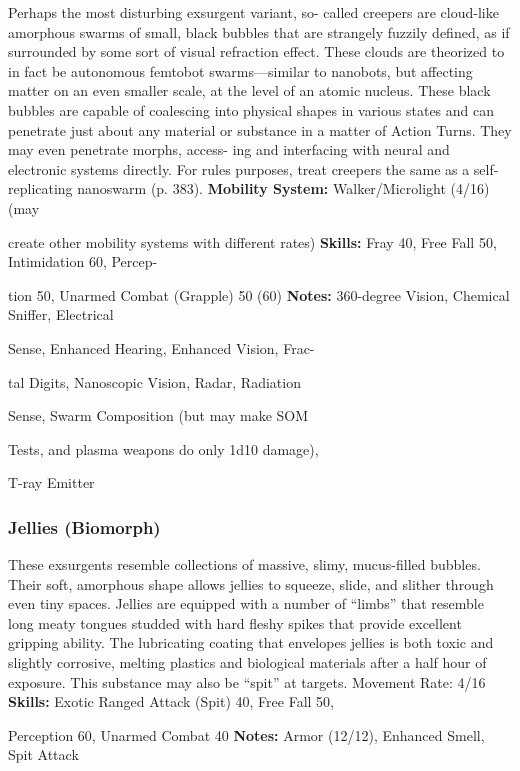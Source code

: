 Perhaps the most disturbing exsurgent variant, so-
called creepers are cloud-like amorphous swarms of 
small, black bubbles that are strangely fuzzily defined, 
as if surrounded by some sort of visual refraction effect. 
These clouds are theorized to in fact be autonomous 
femtobot swarms—similar to nanobots, but affecting 
matter on an even smaller scale, at the level of an atomic 
nucleus. These black bubbles are capable of coalescing 
into physical shapes in various states and can penetrate 
just about any material or substance in a matter of 
Action Turns. They may even penetrate morphs, access-
ing and interfacing with neural and electronic systems 
directly. For rules purposes, treat creepers the same as a 
self-replicating nanoswarm (p. 383).
\textbf{Mobility System: }Walker/Microlight (4/16) (may 

create other mobility systems with different rates)
\textbf{Skills:} Fray 40, Free Fall 50, Intimidation 60, Percep-

tion 50, Unarmed Combat (Grapple) 50 (60) 
\textbf{Notes: }360-degree Vision, Chemical Sniffer, Electrical 

Sense, Enhanced Hearing, Enhanced Vision, Frac-

tal Digits, Nanoscopic Vision, Radar, Radiation 

Sense, Swarm Composition (but may make SOM 

Tests, and plasma weapons do only 1d10 damage), 

T-ray Emitter

\subsubsection{Jellies (Biomorph)}

These exsurgents resemble collections of massive, slimy, 
mucus-filled bubbles. Their soft, amorphous shape 
allows jellies to squeeze, slide, and slither through 
even tiny spaces. Jellies are equipped with a number 
of ``limbs'' that resemble long meaty tongues studded 
with hard fleshy spikes that provide excellent gripping 
ability. The lubricating coating that envelopes jellies is 
both toxic and slightly corrosive, melting plastics and 
biological materials after a half hour of exposure. This 
substance may also be ``spit'' at targets.
\textbf{ }
Movement Rate: 4/16
\textbf{Skills:} Exotic Ranged Attack (Spit) 40, Free Fall 50, 

Perception 60, Unarmed Combat 40
\textbf{Notes:} Armor (12/12), Enhanced Smell, Spit Attack 

